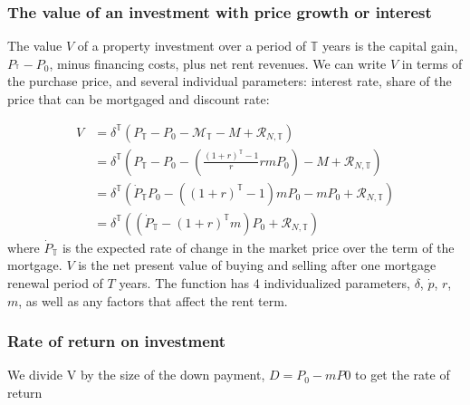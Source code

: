 {\subsubsection{The value of an investment with price growth or interest}
 The value $V$ of a property investment over a period of $\mathbb{T}$ years is  the capital gain, $P_{^\mathbb{T}}-P_{0}$, minus financing costs, plus net rent revenues.
 We can write $V$ in terms of the purchase price, and several individual parameters: interest  rate, share of the price that can be mortgaged and  discount rate:%
 
 \begin{align}
V &= \delta^\mathbb{T}\left( P_\mathbb{T}-P_0-\mathcal{M}_{\mathbb{T}}- M+ \mathcal{R}_{N, \mathbb{T}} \right)      \nonumber\\
&= \delta^\mathbb{T}\left( P_\mathbb{T}-P_0- \left(\frac{(1+r)^\mathbb{T}-1}{r}rmP_0\right)- M+ \mathcal{R}_{N, \mathbb{T}} \right)      \nonumber\\
&= \delta^\mathbb{T} \left(
\dot P_\mathbb{T} P_0 -\left((1+r)^\mathbb{T}-1\right)mP_0-mP_0
 +  \mathcal{R}_{N, \mathbb{T}} \right) 
\label{first_sub}\nonumber\\
  &= \delta^\mathbb{T} \left((\dot P_\mathbb{T} - (1+r)^\mathbb{T}m) P_0 + \mathcal{R}_{N, \mathbb{T}}\right)
\end{align}
where $\dot P_\mathbb{T}$  is the expected rate of change in the market price over the term of the mortgage.
$V$ is the net present value of buying and selling after one mortgage renewal period of $T$ years. %
The function has 4 individualized  parameters, $\delta$, $\dot p$, $r$, $m$, as well as any factors that affect the rent term.


\subsubsection{Rate of return on investment}
We divide V by the size of the down payment, $D=P_0-mP0$ to get the  rate of return  

}
